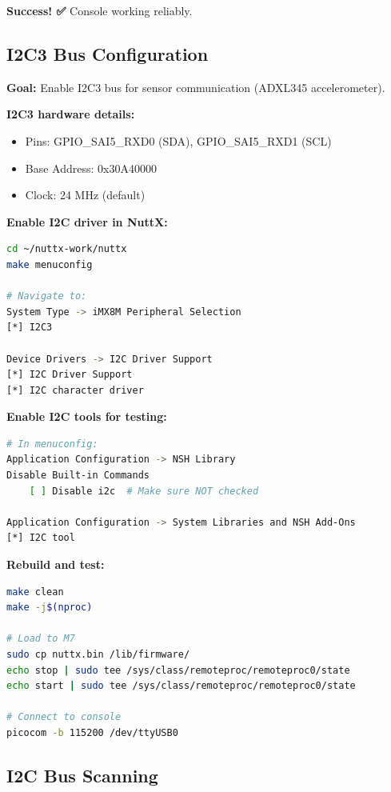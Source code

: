 \documentclass[12pt,a4paper]{report}
\begin{document}

\textbf{Success! ✅} Console working reliably.

\subsection{I2C3 Bus Configuration}

\textbf{Goal:} Enable I2C3 bus for sensor communication (ADXL345 accelerometer).

\textbf{I2C3 hardware details:}
\begin{itemize}
    \item Pins: GPIO\_SAI5\_RXD0 (SDA), GPIO\_SAI5\_RXD1 (SCL)
    \item Base Address: 0x30A40000
    \item Clock: 24 MHz (default)
\end{itemize}

\textbf{Enable I2C driver in NuttX:}

\begin{lstlisting}[language=bash]
cd ~/nuttx-work/nuttx
make menuconfig

# Navigate to:
System Type -> iMX8M Peripheral Selection
[*] I2C3

Device Drivers -> I2C Driver Support
[*] I2C Driver Support
[*] I2C character driver
\end{lstlisting}

\textbf{Enable I2C tools for testing:}

\begin{lstlisting}[language=bash]
# In menuconfig:
Application Configuration -> NSH Library
Disable Built-in Commands
    [ ] Disable i2c  # Make sure NOT checked

Application Configuration -> System Libraries and NSH Add-Ons
[*] I2C tool
\end{lstlisting}

\textbf{Rebuild and test:}

\begin{lstlisting}[language=bash]
make clean
make -j$(nproc)

# Load to M7
sudo cp nuttx.bin /lib/firmware/
echo stop | sudo tee /sys/class/remoteproc/remoteproc0/state
echo start | sudo tee /sys/class/remoteproc/remoteproc0/state

# Connect to console
picocom -b 115200 /dev/ttyUSB0
\end{lstlisting}

\subsection{I2C Bus Scanning}
\end{document}
